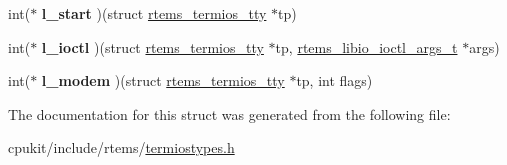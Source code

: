 \begin{DoxyCompactItemize}
int($\ast$ {\bfseries l\+\_\+start} )(struct \mbox{\hyperlink{structrtems__termios__tty}{rtems\+\_\+termios\+\_\+tty}} $\ast$tp)
\item 
\mbox{\label{structrtems__termios__linesw_a6c9895a4c20f6c36ed0a21111aa3c121}} 
int($\ast$ {\bfseries l\+\_\+ioctl} )(struct \mbox{\hyperlink{structrtems__termios__tty}{rtems\+\_\+termios\+\_\+tty}} $\ast$tp, \mbox{\hyperlink{structrtems__libio__ioctl__args__t}{rtems\+\_\+libio\+\_\+ioctl\+\_\+args\+\_\+t}} $\ast$args)
\item 
\mbox{\label{structrtems__termios__linesw_aa4783143fadfbaaafcdcbac33b9f32da}} 
int($\ast$ {\bfseries l\+\_\+modem} )(struct \mbox{\hyperlink{structrtems__termios__tty}{rtems\+\_\+termios\+\_\+tty}} $\ast$tp, int flags)
\end{DoxyCompactItemize}


The documentation for this struct was generated from the following file\+:\begin{DoxyCompactItemize}
\item 
cpukit/include/rtems/\mbox{\hyperlink{termiostypes_8h}{termiostypes.\+h}}\end{DoxyCompactItemize}
